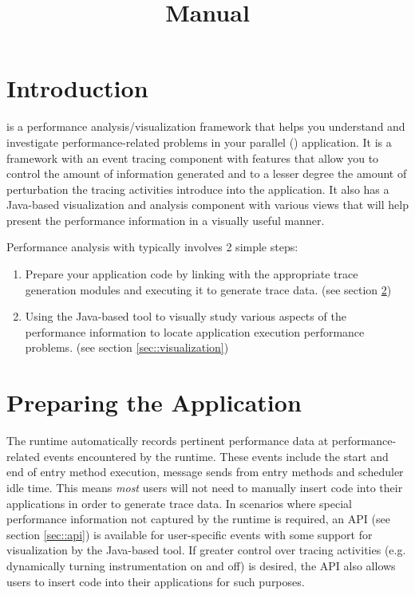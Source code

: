 \documentclass[10pt]{article}
\title{\projections{} Manual}
\begin{document}
\maketitle

\section{Introduction}

\projections{} is a performance analysis/visualization framework that
helps you understand and investigate performance-related problems in
your parallel (\charmpp{}) application. It is a framework with an
event tracing component with features that allow you to control the
amount of information generated and to a lesser degree the amount of
perturbation the tracing activities introduce into the application. It
also has a Java-based visualization and analysis component with
various views that will help present the performance information in a
visually useful manner.

Performance analysis with \projections{} typically involves 2 simple
steps:

\begin{enumerate}
\item 
Prepare your application code by linking with the appropriate trace
generation modules and executing it to generate trace data. (see
section \ref{sec::preparation})
\item
Using the Java-based tool to visually study various aspects of the
performance information to locate application execution performance
problems. (see section \ref{sec::visualization})
\end{enumerate}

\section{Preparing the \charmpp{} Application}
\label{sec::preparation}

The \charmpp{} runtime automatically records pertinent performance
data at performance-related events encountered by the runtime. These
events include the start and end of entry method execution, message
sends from entry methods and scheduler idle time. This means {\em
most} users will not need to manually insert code into their
applications in order to generate trace data. In scenarios where
special performance information not captured by the runtime is
required, an API (see section \ref{sec::api}) is available for
user-specific events with some support for visualization by the
Java-based tool. If greater control over tracing activities
(e.g. dynamically turning instrumentation on and off) is desired, the
API also allows users to insert code into their applications for such
purposes.
\end{document}
